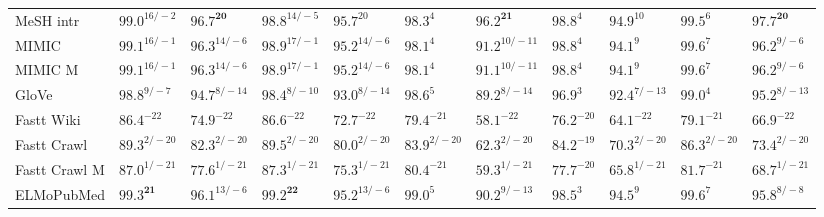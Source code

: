 \documentclass[letterpaper]{article} %
\begin{document}
\begin{table}[h]
\begin{tabular}{l l l l l l l l l l l}
MeSH intr & $99.0^{16/-2}$ & $\mathbf{96.7^{20}}$ & $98.8^{14/-5}$ & $95.7^{20}$ & $98.3^{4}$ & $\mathbf{96.2^{21}}$ & $98.8^{4}$ & $94.9^{10}$ & $99.5^{6}$ & $\mathbf{97.7^{20}}$ \\
MIMIC & $99.1^{16/-1}$ & $96.3^{14/-6}$ & $98.9^{17/-1}$ & $95.2^{14/-6}$ & $98.1^{4}$ & $91.2^{10/-11}$ & $98.8^{4}$ & $94.1^{9}$ & $99.6^{7}$ & $96.2^{9/-6}$ \\
MIMIC M & $99.1^{16/-1}$ & $96.3^{14/-6}$ & $98.9^{17/-1}$ & $95.2^{14/-6}$ & $98.1^{4}$ & $91.1^{10/-11}$ & $98.8^{4}$ & $94.1^{9}$ & $99.6^{7}$ & $96.2^{9/-6}$ \\
\midrule
GloVe & $98.8^{9/-7}$ & $94.7^{8/-14}$ & $98.4^{8/-10}$ & $93.0^{8/-14}$ & $98.6^{5}$ & $89.2^{8/-14}$ & $96.9^{3}$ & $92.4^{7/-13}$ & $99.0^{4}$ & $95.2^{8/-13}$ \\
Fastt Wiki & $86.4^{-22}$ & $74.9^{-22}$ & $86.6^{-22}$ & $72.7^{-22}$ & $79.4^{-21}$ & $58.1^{-22}$ & $76.2^{-20}$ & $64.1^{-22}$ & $79.1^{-21}$ & $66.9^{-22}$ \\
Fastt Crawl & $89.3^{2/-20}$ & $82.3^{2/-20}$ & $89.5^{2/-20}$ & $80.0^{2/-20}$ & $83.9^{2/-20}$ & $62.3^{2/-20}$ & $84.2^{-19}$ & $70.3^{2/-20}$ & $86.3^{2/-20}$ & $73.4^{2/-20}$ \\
Fastt Crawl M & $87.0^{1/-21}$ & $77.6^{1/-21}$ & $87.3^{1/-21}$ & $75.3^{1/-21}$ & $80.4^{-21}$ & $59.3^{1/-21}$ & $77.7^{-20}$ & $65.8^{1/-21}$ & $81.7^{-21}$ & $68.7^{1/-21}$ \\
\midrule
ELMoPubMed & $\mathbf{99.3^{21}}$ & $96.1^{13/-6}$ & $\mathbf{99.2^{22}}$ & $95.2^{13/-6}$ & $99.0^{5}$ & $90.2^{9/-13}$ & $98.5^{3}$ & $94.5^{9}$ & $99.6^{7}$ & $95.8^{8/-8}$ \\

\end{tabular}
\end{table}
\end{document}
